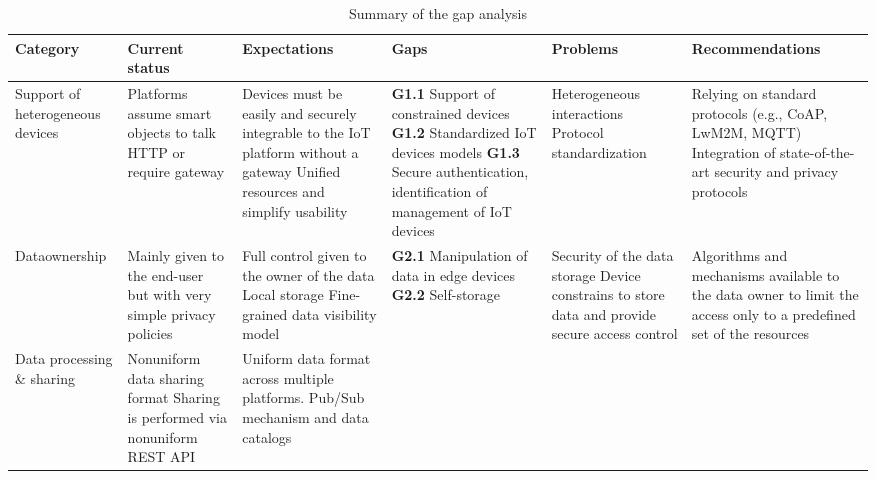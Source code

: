 \documentclass[preprint,10pt,5p]{elsarticle}
\begin{document}
\begin{table*}[!ht]
 \caption{Summary of the gap analysis}\label{tab:gapAnalysis}
 \centering
 \scriptsize
 \begin{tabular}{|m{}|m{}|m{}|
     m{}|m{}|m{}|}
  \hline
  {\small Category} & {\small Current status} & {\small Expectations} &
{\small Gaps} & {\small Problems} & {\small Recommendations}\\
  \hline\hline
Support of heterogeneous devices & 
Platforms assume smart objects to talk HTTP or require gateway & 
{\tiny}Devices must be easily and securely integrable to the IoT platform without a
  gateway 
  \newline{}{\tiny} Unified resources and simplify usability &
\textbf{G1.1} Support of constrained devices
  \newline{}\textbf{G1.2} Standardized IoT devices models
  \newline{}\textbf{G1.3} Secure authentication, identification of management of IoT devices &
{\tiny} Heterogeneous interactions
  \newline{}{\tiny} Protocol standardization
  & 
{\tiny} Relying on standard protocols (e.g., CoAP, LwM2M, MQTT)
  \newline{}{\tiny} Integration of state-of-the-art security and privacy protocols\\
  \hline
Data\newline{}ownership & 
Mainly given to the end-user but with very simple privacy policies & 
{\tiny} Full control given to the owner of the data
  \newline{}{\tiny} Local storage
  \newline{}{\tiny} Fine-grained data visibility model & 
\textbf{G2.1} Manipulation of data in edge devices
  \newline{}\textbf{G2.2} Self-storage &
{\tiny} Security of the data storage
  \newline{}{\tiny} Device constrains to store data and provide
  secure access control & 
Algorithms and mechanisms available to the data owner to limit the access only to a predefined set of the resources\\
  \hline
Data processing \& sharing &
{\tiny} Nonuniform data sharing format
  \newline{}{\tiny} Sharing is performed via nonuniform REST API & 
{\tiny} Uniform data format across multiple platforms.
  \newline{}{\tiny} Pub/Sub mechanism and data catalogs 

\end{tabular}
\end{table*}
\end{document}
